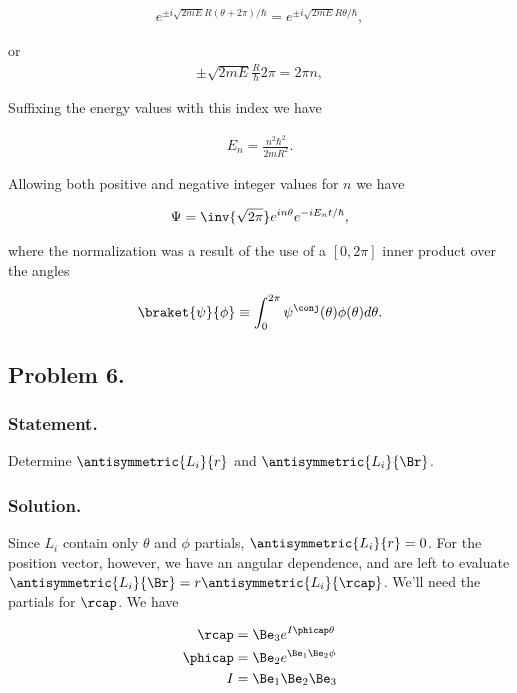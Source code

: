 \begin{align*}
e^{ \pm i \sqrt{2m E} R (\theta + 2\pi)/\hbar } = e^{ \pm i \sqrt{2m E} R \theta/\hbar },
\end{align*}

or
\begin{align*}
\pm \sqrt{2m E} \frac{R}{\hbar} 2\pi = 2 \pi n,
\end{align*}

Suffixing the energy values with this index we have

\begin{align}\label{eqn:desaiCh4:505}
E_n = \frac{n^2 \hbar^2}{2 m R^2}.
\end{align}

Allowing both positive and negative integer values for $n$ we have

\begin{align}\label{eqn:desaiCh4:506}
\Psi = \inv{\sqrt{2\pi}} e^{i n \theta} e^{-i E_n t/\hbar},
\end{align}

where the normalization was a result of the use of a $[0,2\pi]$ inner product over the angles

\begin{align}\label{eqn:desaiCh4:507}
\braket{\psi}{\phi} \equiv \int_0^{2\pi} \psi^\conj(\theta) \phi(\theta) d\theta.
\end{align}

\subsection{Problem 6.}
\subsubsection{Statement.}

Determine $\antisymmetric{L_i}{r}$ and $\antisymmetric{L_i}{\Br}$.

\subsubsection{Solution.}

Since $L_i$ contain only $\theta$ and $\phi$ partials, $\antisymmetric{L_i}{r} = 0$.  For the position vector, however, we have an angular dependence, and are left to evaluate $\antisymmetric{L_i}{\Br} = r \antisymmetric{L_i}{\rcap}$.  We'll need the partials for $\rcap$.  We have

\begin{align}\label{eqn:desaiCh4:600}
\rcap &= \Be_3 e^{I \phicap \theta} \\
\phicap &= \Be_2 e^{\Be_1 \Be_2 \phi} \\
I &= \Be_1 \Be_2 \Be_3
\end{align}


